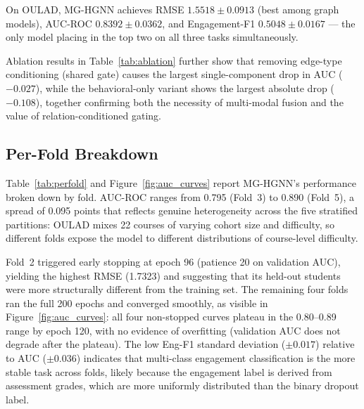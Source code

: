 \documentclass[sigconf]{acmart}
\begin{document}
On OULAD, MG-HGNN achieves RMSE $1.5518 \pm 0.0913$
(best among graph models), AUC-ROC $0.8392 \pm 0.0362$,
and Engagement-F1 $0.5048 \pm 0.0167$ --- the only model
placing in the top two on all three tasks simultaneously.

Ablation results in Table~\ref{tab:ablation} further
show that removing edge-type conditioning (shared gate)
causes the largest single-component drop in AUC
($-0.027$), while the behavioral-only variant shows the
largest absolute drop ($-0.108$), together confirming
both the necessity of multi-modal fusion and the value
of relation-conditioned gating.

\subsection{Per-Fold Breakdown}

Table~\ref{tab:perfold} and Figure~\ref{fig:auc_curves}
report MG-HGNN's performance broken down by fold.
AUC-ROC ranges from 0.795 (Fold~3) to 0.890
(Fold~5), a spread of 0.095 points that reflects
genuine heterogeneity across the five stratified
partitions: OULAD mixes 22 courses of varying
cohort size and difficulty, so different folds
expose the model to different distributions of
course-level difficulty.

Fold~2 triggered early stopping at epoch 96 (patience
20 on validation AUC), yielding the highest RMSE
(1.7323) and suggesting that its held-out students
were more structurally different from the training
set. The remaining four folds ran the full 200
epochs and converged smoothly, as visible in
Figure~\ref{fig:auc_curves}: all four non-stopped
curves plateau in the 0.80--0.89 range by epoch 120,
with no evidence of overfitting (validation AUC does
not degrade after the plateau). The low Eng-F1
standard deviation ($\pm 0.017$) relative to AUC
($\pm 0.036$) indicates that multi-class engagement
classification is the more stable task across folds,
likely because the engagement label is derived from
assessment grades, which are more uniformly
distributed than the binary dropout label.
\end{document}

